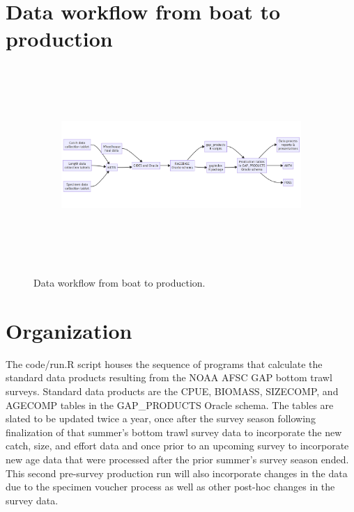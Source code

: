 \documentclass[
  letterpaper,
  oneside,
  open=any]{scrbook}
\begin{document}
\hypertarget{data-workflow-from-boat-to-production}{%
\section{Data workflow from boat to
production}\label{data-workflow-from-boat-to-production}}

\begin{figure}

{\centering 

\begin{figure}[H]

{\centering \includegraphics[width=12.35in,height=2.96in]{content/intro-workflow_files/figure-latex/mermaid-figure-1.png}

}

\end{figure}

}

\caption{\label{fig-workflow}Data workflow from boat to production.}

\end{figure}

\hypertarget{organization}{%
\section{Organization}\label{organization}}

The code/run.R script houses the sequence of programs that calculate the
standard data products resulting from the NOAA AFSC GAP bottom trawl
surveys. Standard data products are the CPUE, BIOMASS, SIZECOMP, and
AGECOMP tables in the GAP\_PRODUCTS Oracle schema. The tables are slated
to be updated twice a year, once after the survey season following
finalization of that summer's bottom trawl survey data to incorporate
the new catch, size, and effort data and once prior to an upcoming
survey to incorporate new age data that were processed after the prior
summer's survey season ended. This second pre-survey production run will
also incorporate changes in the data due to the specimen voucher process
as well as other post-hoc changes in the survey data.
\end{document}
